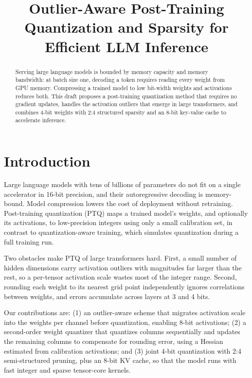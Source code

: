 \documentclass{article}
\title{Outlier-Aware Post-Training Quantization and Sparsity for Efficient LLM Inference}
\begin{document}
\maketitle

\begin{abstract}
Serving large language models is bounded by memory capacity and memory
bandwidth: at batch size one, decoding a token requires reading every weight
from GPU memory. Compressing a trained model to low bit-width weights and
activations reduces both. This draft proposes a post-training quantization
method that requires no gradient updates, handles the activation outliers that
emerge in large transformers, and combines 4-bit weights with 2:4 structured
sparsity and an 8-bit key-value cache to accelerate inference.
\end{abstract}

\section{Introduction}
Large language models with tens of billions of parameters do not fit on a
single accelerator in 16-bit precision, and their autoregressive decoding is
memory-bound. Model compression lowers the cost of deployment without
retraining. Post-training quantization (PTQ) maps a trained model's weights,
and optionally its activations, to low-precision integers using only a small
calibration set, in contrast to quantization-aware training, which simulates
quantization during a full training run.

Two obstacles make PTQ of large transformers hard. First, a small number of
hidden dimensions carry activation outliers with magnitudes far larger than
the rest, so a per-tensor activation scale wastes most of the integer range.
Second, rounding each weight to its nearest grid point independently ignores
correlations between weights, and errors accumulate across layers at 3 and 4
bits.

Our contributions are: (1) an outlier-aware scheme that migrates activation
scale into the weights per channel before quantization, enabling 8-bit
activations; (2) a second-order weight quantizer that quantizes columns
sequentially and updates the remaining columns to compensate for rounding
error, using a Hessian estimated from calibration activations; and (3) joint
4-bit quantization with 2:4 semi-structured pruning, plus an 8-bit KV cache, so
that the model runs with fast integer and sparse tensor-core kernels.
\end{document}
